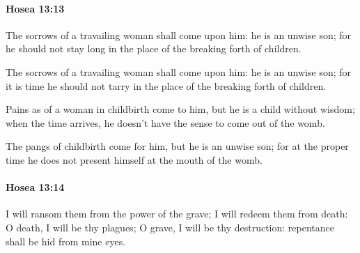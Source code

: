 		\paragraph{Hosea 13:13} %
			\label{HOSEA-13-13}

			The sorrows of a travailing woman shall come upon him: he is an unwise son; for he should not stay long in the place of the breaking forth of children.

			\begin{versebox}
					\item[BHS] 
					\item[LXX] 
					\item[ASV] The sorrows of a travailing woman shall come upon him: he is an unwise son; for it is time he should not tarry in the place of the breaking forth of children.
					\item[NIV] Pains as of a woman in childbirth come to him, but he is a child without wisdom; when the time arrives, he doesn’t have the sense to come out of the womb.
					\item[NRSV] The pangs of childbirth come for him, but he is an unwise son; for at the proper time he does not present himself at the mouth of the womb.
			\end{versebox}

		\paragraph{Hosea 13:14} %
			\label{HOSEA-13-14}

			I will ransom them from the power of the grave; I will redeem them from death: O death, I will be thy plagues; O grave, I will be thy destruction: repentance shall be hid from mine eyes.

